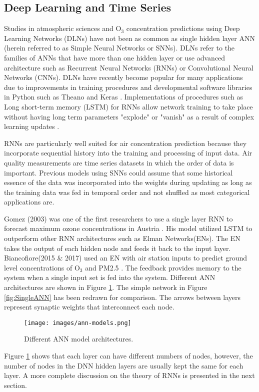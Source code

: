 \documentclass[preprint,12pt,authoryear]{elsarticle}
\begin{document}
\begin{linenumbers}

\subsection{Deep Learning and Time Series}
Studies in atmospheric sciences and O$_{3}$ concentration predictions using Deep Learning Networks (DLNs) have not been as common as single hidden layer ANN (herein referred to as Simple Neural Networks or SNNs). DLNs refer to the families of ANNs that have more than one hidden layer or use advanced architecture such as Recurrent Neural Networks (RNNs) or Convolutional Neural Networks (CNNs)\cite{Goodfellow2016}. DLNs have recently become popular for many applications due to improvements in training procedures and developmental software libraries in Python such as Theano \citep{Theano2016} and Keras \citep{keras2015}. Implementations of procedures such as Long short-term memory (LSTM) for RNNs allow network training to take place without having long term parameters "explode" or "vanish" as a result of complex learning updates \citep{Pascanu2013}.

RNNs are particularly well suited for air concentration prediction because they incorporate sequential history into the training and processing of input data. Air quality measurements are time series datasets in which the order of data is important. Previous models using SNNs could assume that some historical essence of the data was incorporated into the weights during updating as long as the training data was fed in temporal order and not shuffled as most categorical applications are.

Gomez (2003) was one of the first researchers to use a single layer RNN to forecast maximum ozone concentrations in Austria \citep{Gomez2003}. His model utilized LSTM to outperform other RNN architectures such as Elman Networks(ENs). The EN takes the output of each hidden node and feeds it back to the input layer. Biancofiore(2015 \& 2017) used an EN with air station inputs to predict ground level concentrations of O$_{3}$\citep{Biancofiore2015} and PM2.5 \citep{Biancofiore2017}. The feedback provides memory to the system when a single input set is fed into the system. Different ANN architectures are shown in Figure \ref{fig:ANNmodels}. The simple network in Figure \ref{fig:SingleANN} has been redrawn for comparison.  The arrows between layers represent synaptic weights that interconnect each node.
%
\begin{figure}[H]
\centering
\texttt{[image: images/ann-models.png]} 
\caption{Different ANN model architectures.}
\label{fig:ANNmodels}
\end{figure}
%
Figure \ref{fig:ANNmodels} shows that each layer can have different numbers of nodes, however, the number of nodes in the DNN hidden layers are usually kept the same for each layer. A more complete discussion on the theory of RNNs is presented in the next section.


\end{linenumbers}
\end{document}
